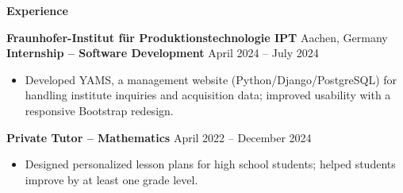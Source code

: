 \documentclass[10pt]{article}
\begin{document}
\vspace{1pt}

\begin{center}
    \textbf{\large Experience}
\end{center}

\textbf{Fraunhofer-Institut für Produktionstechnologie IPT} \hfill Aachen, Germany \\
\textbf{Internship -- Software Development} \hfill April 2024 -- July 2024
\begin{itemize}[noitemsep, topsep=1pt, partopsep=0pt, parsep=0pt]
    \item Developed YAMS, a management website (Python/Django/PostgreSQL) for handling institute inquiries and acquisition data; improved usability with a responsive Bootstrap redesign.
\end{itemize}
\vspace{4pt}

\textbf{Private Tutor -- Mathematics} \hfill April 2022 -- December 2024
\begin{itemize}[noitemsep, topsep=1pt, partopsep=0pt, parsep=0pt]
    \item Designed personalized lesson plans for high school students; helped students improve by at least one grade level.
\end{itemize}
\end{document}
